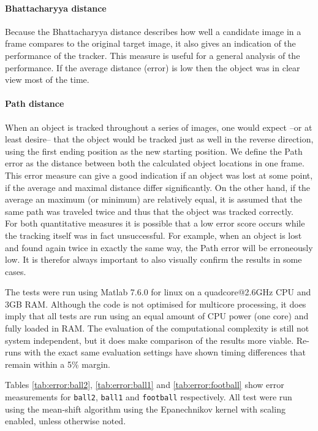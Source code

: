 \documentclass[a4paper,11pt]{article}
\begin{document}
\paragraph{Bhattacharyya distance} Because the Bhattacharyya distance describes how well a candidate image in a frame compares to the original target image, it also gives an indication of the performance of the tracker.
This measure is useful for a general analysis of the performance.
If the average distance (error) is low then the object was in clear view most of the time.

\paragraph{Path distance} When an object is tracked throughout a series of images, one would expect --or at least desire-- that the object would be tracked just as well in the reverse direction, using the first ending position as the new starting position.
We define the Path error as the distance between both the calculated object locations in one frame.
This error measure can give a good indication if an object was lost at some point, if the average and maximal distance differ significantly.
On the other hand, if the average an maximum (or minimum) are relatively equal, it is assumed that the same path was traveled twice and thus that the object was tracked correctly.\\

For both quantitative measures it is possible that a low error score occurs while the tracking itself was in fact unsuccessful.
For example, when an object is lost and found again twice in exactly the same way, the Path error will be erroneously low.
It is therefor always important to also visually confirm the results in some cases.

The tests were run using Matlab 7.6.0 for linux on a quadcore@2.6GHz CPU and 3GB RAM.
Although the code is not optimised for multicore processing, it does imply that all tests are run using an equal amount of CPU power (one core) and fully loaded in RAM.
The evaluation of the computational complexity is still not system independent, but it does make comparison of the results more viable.
Re-runs with the exact same evaluation settings have shown timing differences that remain within a 5\% margin.

Tables \ref{tab:error:ball2}, \ref{tab:error:ball1} and \ref{tab:error:football} show error measurements for \texttt{ball2}, \texttt{ball1} and \texttt{football} respectively.
All test were run using the mean-shift algorithm using the Epanechnikov kernel with scaling enabled, unless otherwise noted.
\end{document}

